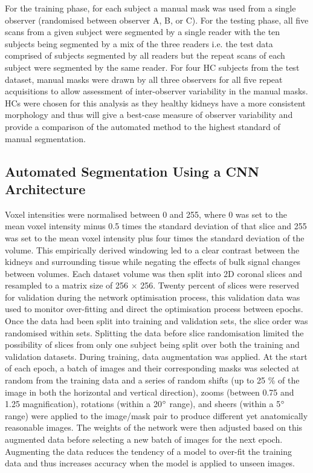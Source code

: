 For the training phase, for each subject a manual mask was used from a single observer (randomised between observer A, B, or C). For the testing phase, all five scans from a given subject were segmented by a single reader with the ten subjects being segmented by a mix of the three readers i.e. the test data comprised of subjects segmented by all readers but the repeat scans of each subject were segmented by the same reader. For four \ac{HC} subjects from the test dataset, manual masks were drawn by all three observers for all five repeat acquisitions to allow assessment of inter-observer variability in the manual masks. \ac{HC}s were chosen for this analysis as they healthy kidneys have a more consistent morphology and thus will give a best-case measure of observer variability and provide a comparison of the automated method to the highest standard of manual segmentation.

\subsection{Automated Segmentation Using a CNN Architecture}

Voxel intensities were normalised between 0 and 255, where 0 was set to the mean voxel intensity minus 0.5 times the standard deviation of that slice and 255 was set to the mean voxel intensity plus four times the standard deviation of the volume. This empirically derived windowing led to a clear contrast between the kidneys and surrounding tissue while negating the effects of bulk signal changes between volumes. Each dataset volume was then split into 2D coronal slices and resampled to a matrix size of 256 $\times$ 256. Twenty percent of slices were reserved for validation during the network optimisation process, this validation data was used to monitor over-fitting and direct the optimisation process between epochs. Once the data had been split into training and validation sets, the slice order was randomised within sets. Splitting the data before slice randomisation limited the possibility of slices from only one  subject being split over both the training and validation datasets. During training, data augmentation was applied. At the start of each epoch, a batch of images and their corresponding masks was selected at random from the training data and a series of random shifts (up to 25 \% of the image in both the horizontal and vertical direction), zooms (between 0.75 and 1.25 magnification), rotations (within a 20$\degree$ range), and sheers (within a 5$\degree$ range) were applied to the image/mask pair to produce different yet anatomically reasonable images. The weights of the network were then adjusted based on this augmented data before selecting a new batch of images for the next epoch. Augmenting the data reduces the tendency of a model to over-fit the training data and thus increases accuracy when the model is applied to unseen images. 

